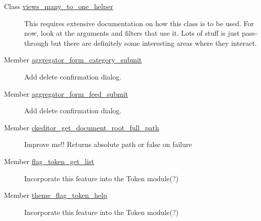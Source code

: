 \label{todo__todo000008}
\hypertarget{todo__todo000008}{}
 \begin{description}
\item[Class \hyperlink{classviews__many__to__one__helper}{views\_\-many\_\-to\_\-one\_\-helper} ]This requires extensive documentation on how this class is to be used. For now, look at the arguments and filters that use it. Lots of stuff is just pass-through but there are definitely some interesting areas where they interact.

\end{description}


\label{todo__todo000002}
\hypertarget{todo__todo000002}{}
 \begin{description}
\item[Member \hyperlink{aggregator_8admin_8inc_56c1cadf416d17bd8dd8a53cc6ed5aeb}{aggregator\_\-form\_\-category\_\-submit} ]Add delete confirmation dialog. \end{description}


\label{todo__todo000001}
\hypertarget{todo__todo000001}{}
 \begin{description}
\item[Member \hyperlink{aggregator_8admin_8inc_f98f428f07034e19622342875fe30984}{aggregator\_\-form\_\-feed\_\-submit} ]Add delete confirmation dialog. \end{description}


\label{todo__todo000003}
\hypertarget{todo__todo000003}{}
 \begin{description}
\item[Member \hyperlink{ckeditor_8lib_8inc_2b8784ee84340eb14aa10e274f660fa6}{ckeditor\_\-get\_\-document\_\-root\_\-full\_\-path} ]Improve me!! Returns absolute path or false on failure

\end{description}


\label{todo__todo000005}
\hypertarget{todo__todo000005}{}
 \begin{description}
\item[Member \hyperlink{flag_8token_8inc_bd1686618a4a8ef7eaf9a80e8b3089ba}{flag\_\-token\_\-get\_\-list} ]Incorporate this feature into the Token module(?) \end{description}


\label{todo__todo000004}
\hypertarget{todo__todo000004}{}
 \begin{description}
\item[Member \hyperlink{flag_8token_8inc_19695478804e51a9c21274a3acbf3387}{theme\_\-flag\_\-token\_\-help} ]Incorporate this feature into the Token module(?) \end{description}


